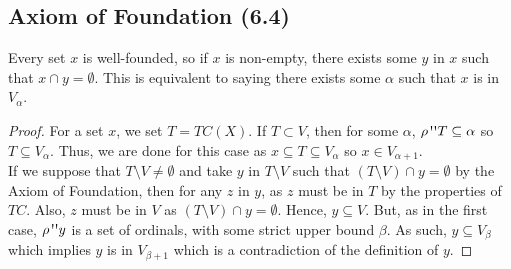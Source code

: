\subsection{Axiom of Foundation (6.4)} \label{6.4}

Every set $x$ is well-founded, so if $x$ is non-empty, there exists
some $y$ in $x$ such that $x \cap y = \emptyset$.
This is equivalent to saying there exists some $\alpha$ such that
$x$ is in $V_\alpha$.

\begin{proof}
    For a set $x$, we set $T = TC(X)$. If $T \subset V$, then for some $\alpha$, 
    $\rho \fran T \subseteq \alpha$ so $T \subseteq V_\alpha$. 
    Thus, we are done for this case as $x \subseteq T \subseteq V_\alpha$ 
    so $x \in V_{\alpha + 1}$.
    \\[\baselineskip]
    If we suppose that $T \setminus V \neq \emptyset$ and take $y$ in
    $T \setminus V$ such that $(T \setminus V) \cap y = \emptyset$
    by the Axiom of Foundation, then for any $z$ in $y$, 
    as $z$ must be in $T$ by the properties of $TC$.
    Also, $z$ must be in $V$ as $(T \setminus V) \cap y = \emptyset$.
    Hence, $y \subseteq V$. But, as in the first case, $\rho \fran y$ is a set
    of ordinals, with some strict upper bound $\beta$. As such, 
    $y \subseteq V_\beta$ which implies $y$ is in $V_{\beta + 1}$
    which is a contradiction of the definition of $y$.
\end{proof}
